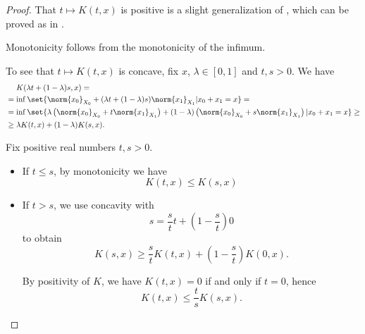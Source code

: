 \begin{proof}
   That \( t \mapsto K(t, x) \) is positive is a slight generalization of , which can be proved as in .

  Monotonicity follows from the monotonicity of the infimum.

  To see that \( t \mapsto K(t, x) \) is concave, fix \( x \), \( \lambda \in [0, 1] \) and \( t, s > 0 \). We have
  \begin{align*}
    &\phantom{{}={}}
    K(\lambda t + (1 - \lambda) s, x)
    = \\ &=
    \inf \set{ \norm{x_0}_{X_0} + (\lambda t + (1 - \lambda) s)\norm{x_1}_{X_1} | x_0 + x_1 = x }
    = \\ &=
    \inf \set{ \lambda \left(\norm{x_0}_{X_0} + t \norm{x_1}_{X_1} \right) + (1 - \lambda) \left(\norm{x_0}_{X_0} + s \norm{x_1}_{X_1} \right) | x_0 + x_1 = x }
    \geq \\ &\geq
    \lambda K(t, x) + (1 - \lambda) K(s, x).
  \end{align*}

   Fix positive real numbers \( t, s > 0 \).
  \begin{itemize}
    \item If \( t \leq s \), by monotonicity we have
    \begin{equation}\label{eq:def:k_functional_properties/inequality/monotonicity}
      K(t, x) \leq K(s, x)
    \end{equation}

    \item If \( t > s \), we use concavity with
    \begin{equation*}
      s = \frac s t t + \left(1 - \frac s t \right) 0
    \end{equation*}
    to obtain
    \begin{equation*}
      K(s, x) \geq \frac s t K(t, x) + \left(1 - \frac s t \right) K(0, x).
    \end{equation*}

    By positivity of \( K \), we have \( K(t, x) = 0 \) if and only if \( t = 0 \), hence
    \begin{equation}\label{eq:def:k_functional_properties/inequality/concavity}
      K(t, x) \leq \frac t s K(s, x).
    \end{equation}
  \end{itemize}


\end{proof}
